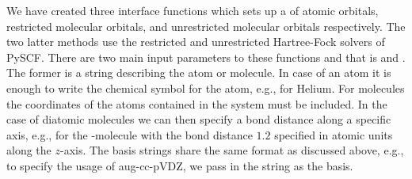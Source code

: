         We have created three interface functions which sets up a
         of atomic orbitals, restricted molecular orbitals,
        and unrestricted molecular orbitals respectively.
        The two latter methods use the restricted and unrestricted Hartree-Fock
        solvers of PySCF.
        There are two main input parameters to these functions and that is
         and .
        The former is a string describing the atom or molecule.
        In case of an atom it is enough to write the chemical symbol for the
        atom, e.g.,  for Helium.
        For molecules the coordinates of the atoms contained in the system must
        be included.
        In the case of diatomic molecules we can then specify a bond distance
        along a specific axis, e.g.,  for the
        -molecule with the bond distance $1.2$ specified in atomic units
        along the $z$-axis.
        The basis strings share the same format as discussed above, e.g., to
        specify the usage of aug-cc-pVDZ, we pass in the string
         as the basis.


